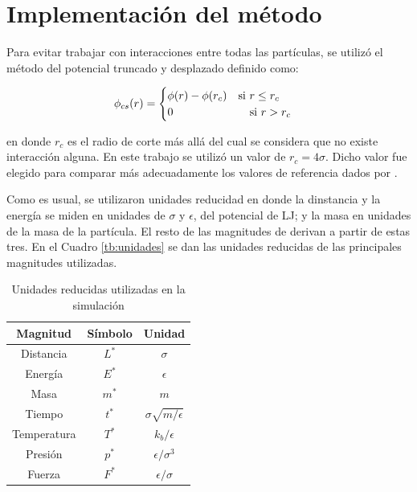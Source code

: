 \documentclass[a4paper,12pt]{article}
\begin{document}
\section{Implementación del método}

Para evitar trabajar con interacciones entre todas las partículas, se utilizó 
el método del potencial truncado y desplazado definido como:

\begin{equation}\label{eq:pot_cs}
  \phi_{cs}(r) = 
  \begin{cases}
	  \phi(r)- \phi(r_c) \quad \text{si } r \leq r_c \\
	  0 \hspace{2.4cm} \text{si } r > r_c
  \end{cases}
\end{equation}

\noindent en donde $r_c$ es el radio de corte más allá del cual se considera 
que no existe interacción alguna. En este trabajo se utilizó un valor de 
$r_c=4\sigma$. Dicho valor fue elegido para comparar más adecuadamente los 
valores de referencia dados por \cite{johnson1993}.

Como es usual, se utilizaron unidades reducidad en donde la dinstancia y la 
energía se miden en unidades de $\sigma$ y $\epsilon$, del potencial de LJ; y 
la masa en unidades de la masa de la partícula. El resto de las magnitudes de 
derivan a partir de estas tres. En el Cuadro \eqref{tb:unidades} se dan las 
unidades reducidas de las principales magnitudes utilizadas.

\begin{table}
	\begin{center}
		\begin{tabular}{ccc}
			\hline
			{\bf Magnitud} & {\bf Símbolo} & {\bf Unidad} \\ \hline
			Distancia   & $L^*$ & $\sigma$ \\ 
			Energía     & $E^*$ & $\epsilon$ \\ 
			Masa        & $m^*$ & $m$ \\ 
			Tiempo      & $t^*$ & $\sigma\sqrt{m/\epsilon}$ \\ 
			Temperatura & $T^*$ & $k_b/\epsilon$ \\ 
			Presión     & $p^*$ & $\epsilon/\sigma^3$ \\ 
			Fuerza      & $F^*$ & $\epsilon/\sigma$ \\ 
			\hline 
		\end{tabular}
	\end{center} 
	\caption{Unidades reducidas utilizadas en la simulación}
	\label{tb:unidades}
\end{table}
\end{document}
